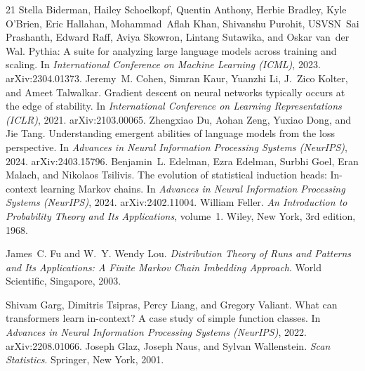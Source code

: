 \documentclass[11pt]{article}
\theoremstyle{plain}
\theoremstyle{definition}
\begin{document}
\begin{thebibliography}{21}
Stella Biderman, Hailey Schoelkopf, Quentin Anthony, Herbie Bradley, Kyle
  O'Brien, Eric Hallahan, Mohammad~Aflah Khan, Shivanshu Purohit, USVSN~Sai
  Prashanth, Edward Raff, Aviya Skowron, Lintang Sutawika, and Oskar van~der
  Wal.
\newblock Pythia: A suite for analyzing large language models across training
  and scaling.
\newblock In \emph{International Conference on Machine Learning (ICML)}, 2023.
  arXiv:2304.01373.
\newblock {}
Jeremy~M. Cohen, Simran Kaur, Yuanzhi Li, J.~Zico Kolter, and Ameet Talwalkar.
\newblock Gradient descent on neural networks typically occurs at the edge of
  stability.
\newblock In \emph{International Conference on Learning Representations
  (ICLR)}, 2021.
\newblock arXiv:2103.00065.
\newblock {}
Zhengxiao Du, Aohan Zeng, Yuxiao Dong, and Jie Tang.
\newblock Understanding emergent abilities of language models from the loss
  perspective.
\newblock In \emph{Advances in Neural Information Processing Systems
  (NeurIPS)}, 2024. arXiv:2403.15796.
\newblock {}
Benjamin~L. Edelman, Ezra Edelman, Surbhi Goel, Eran Malach, and Nikolaos
  Tsilivis.
\newblock The evolution of statistical induction heads: In-context learning
  {Markov} chains.
\newblock In \emph{Advances in Neural Information Processing Systems
  (NeurIPS)}, 2024. arXiv:2402.11004.
\newblock {}
William Feller.
\newblock \emph{An Introduction to Probability Theory and Its Applications},
  volume~1.
\newblock Wiley, New York, 3rd edition, 1968.

James~C. Fu and W.~Y. Wendy Lou.
\newblock \emph{Distribution Theory of Runs and Patterns and Its Applications: A
  Finite Markov Chain Imbedding Approach}.
\newblock World Scientific, Singapore, 2003.

Shivam Garg, Dimitris Tsipras, Percy Liang, and Gregory Valiant.
\newblock What can transformers learn in-context? {A} case study of simple
  function classes.
\newblock In \emph{Advances in Neural Information Processing Systems
  (NeurIPS)}, 2022. arXiv:2208.01066.
\newblock {}
Joseph Glaz, Joseph Naus, and Sylvan Wallenstein.
\newblock \emph{Scan Statistics}.
\newblock Springer, New York, 2001.


\end{thebibliography}
\end{document}
